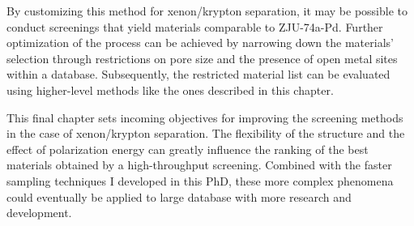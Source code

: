 \documentclass[main]{subfiles}
\begin{document}
By customizing this method for xenon/krypton separation, it may be possible to conduct screenings that yield materials comparable to ZJU-74a-Pd. Further optimization of the process can be achieved by narrowing down the materials' selection through restrictions on pore size and the presence of open metal sites within a database. Subsequently, the restricted material list can be evaluated using higher-level methods like the ones described in this chapter.

\begin{center}
\end{center}

This final chapter sets incoming objectives for improving the screening methods in the case of xenon/krypton separation. The flexibility of the structure and the effect of polarization energy can greatly influence the ranking of the best materials obtained by a high-throughput screening. Combined with the faster sampling techniques I developed in this PhD, these more complex phenomena could eventually be applied to large database with more research and development. 

\OnlyInSubfile{\printglobalbibliography}
\end{document}

